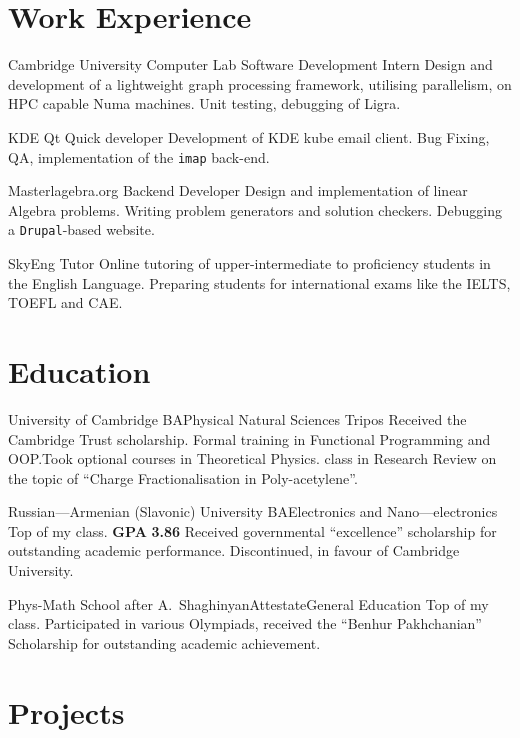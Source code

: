 \documentclass{CurriculumVitae}
\author{Aleksandr Petrosyan}
\date{\today}
\begin{document}
\maketitle

\section*{Work Experience}

{Cambridge University Computer Lab}
{Software Development Intern}
{Design and development of a lightweight graph processing framework, utilising parallelism, on HPC capable Numa machines. Unit testing, debugging of Ligra. }

{KDE}
{Qt Quick developer}
{Development of KDE kube email client. Bug Fixing, QA, implementation of the \texttt{imap} back-end. }

{Masterlagebra.org}
{Backend Developer}
{Design and implementation of linear Algebra problems. Writing problem generators and solution checkers. Debugging a \texttt{Drupal}-based website. }

{SkyEng}
{Tutor}
{Online tutoring of upper-intermediate to proficiency students in the English Language. Preparing students for international exams like the IELTS, TOEFL and CAE.}

\section*{Education}

{University of Cambridge}
{BA}{Physical Natural Sciences Tripos}
{Received the Cambridge Trust scholarship. Formal training in Functional Programming and OOP.\@ Took optional courses in Theoretical Physics.  class in Research Review on the topic of ``Charge Fractionalisation in Poly-acetylene''.}

{Russian---Armenian (Slavonic) University}
{BA}{Electronics and Nano---electronics}
{Top of my class. \textbf{GPA} \textbf{3.86} Received governmental ``excellence'' scholarship for outstanding academic performance. Discontinued, in favour of Cambridge University.}

{Phys-Math School after A.~Shaghinyan}{Attestate}{General Education}
{Top of my class. Participated in various Olympiads, received the ``Benhur Pakhchanian'' Scholarship for outstanding academic achievement. }

\section*{Projects}
\end{document}
